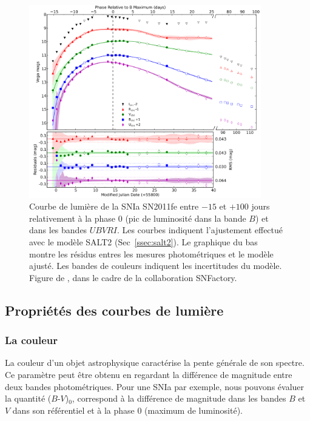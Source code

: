 \documentclass[../main/main.tex]{subfiles}
\begin{document}
\begin{figure}[ht]
  \centering
  \includegraphics[width=0.9\textwidth]{../figures/01bis_sne/lightcurvesnpereira.pdf}
  \caption[Courbe de lumière de la SNIa
  SN2011fe.]{Courbe de lumière de la SNIa SN2011fe entre
  $-15$ et $+100$ jours relativement à la phase $0$ (pic de luminosité
  dans la bande $B$) et dans les bandes $UBVRI$. Les courbes indiquent
  l'ajustement effectué avec le modèle SALT2 (Sec~\ref{ssec:salt2}). Le
  graphique du bas montre les résidus entres les mesures photométriques
  et le modèle ajusté. Les bandes de couleurs indiquent les incertitudes
  du modèle. Figure de \citet{Pereira2013}, dans le cadre de la
  collaboration SNFactory.}
  \label{fig:lightcurvesnpereira}
\end{figure}

\clearpage
\subsection{Propriétés des courbes de lumière}


\subsubsection*{La couleur}

La couleur d'un objet astrophysique caractérise la
pente générale de son spectre. Ce paramètre peut être obtenu en regardant la différence
de magnitude entre deux bandes photométriques. Pour une SNIa par
exemple, nous pouvons évaluer la quantité ($B$-$V$)$_{0}$, correspond à
la différence de magnitude dans les bandes $B$ et $V$ dans son référentiel
et à la phase $0$ (maximum de luminosité).
\end{document}
